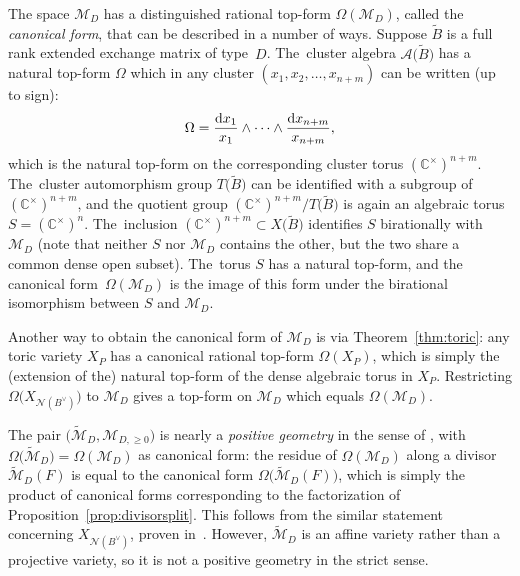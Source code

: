 \documentclass[pdftex]{sigma}%
\def\C{{\mathbb C}}
\def\A{{\mathcal{A}}}
\def\tB{{\tilde B}}
\def\M{{\mathcal{M}}}
\def\tM{{\widetilde {\mathcal{M}}}}
\def\tB{{\tilde B}}
\def\N{{\mathcal{N}}}
\numberwithin{equation}{section}
\begin{document}
\bigskip{}
The space $\M_{D}$ has a distinguished rational top-form $\Omega(\M_D)$, called the \emph{canonical form}, that can be described in a number of ways. Suppose $\tB$ is a full rank extended exchange mat\-rix of type~$D$. The~cluster algebra $\A\big(\tB\big)$ has a natural top-form $\Omega$ which in any cluster $(x_1,x_2,\dots,x_{n+m})$ can be written (up to sign):
\begin{gather*}
\Omega = \frac{{\rm d}x_1}{x_1} \wedge \cdots \wedge \frac{{\rm d}x_{n+m}}{x_{n+m}},
\end{gather*}
which is the natural top-form on the corresponding cluster torus $(\C^\times)^{n+m}$. The~cluster automorphism group $T\big(\tB\big)$ can be identified with a subgroup of $(\C^\times)^{n+m}$, and the quotient group $(\C^\times)^{n+m}/T\big(\tB\big)$ is again an algebraic torus $S = (\C^\times)^n$. The~inclusion $(\C^\times)^{n+m} \subset X\big(\tB\big)$ identifies $S$ birationally with $\M_D$ (note that neither $S$ nor $\M_D$ contains the other, but the two share a common dense open subset). The~torus $S$ has a natural top-form, and the canonical form~$\Omega(\M_D)$ is the image of this form under the birational isomorphism between $S$ and $\M_D$.

Another way to obtain the canonical form of $\M_D$ is via Theorem~\ref{thm:toric}: any toric variety $X_P$ has a canonical rational top-form $\Omega(X_P)$, which is simply the (extension of the) natural top-form of the dense algebraic torus in $X_P$. Restricting $\Omega\big(X_{\N(B^\vee)}\big)$ to $\M_D$ gives a top-form on $\M_D$ which equals $\Omega(\M_D)$.

The pair $\big(\tM_D, \M_{D,\geq 0}\big)$ is nearly a \emph{positive geometry} in the sense of \cite{ABL}, with $\Omega\big(\tM_D\big) = \Omega(\M_D)$ as canonical form: the residue of $\Omega(\M_D)$ along a divisor $\tM_D(F)$ is equal to the canonical form $\Omega\big(\tM_D(F)\big)$, which is simply the product of canonical forms corresponding to the factorization of Proposition~\ref{prop:divisorsplit}. This follows from the similar statement concerning $X_{\N(B^\vee)}$, proven in~\cite[Appendix G]{ABL}. However, $\tM_D$ is an affine variety rather than a projective variety, so it is not a positive geometry in the strict sense.
\end{document}
